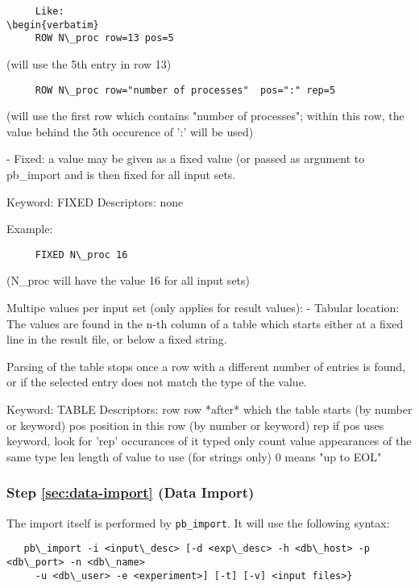 \documentclass[12pt,a4paper]{article}
\begin{document}
\begin{itemize}
\begin{verbatim}
     Like:
\begin{verbatim}
     ROW N\_proc row=13 pos=5
\end{verbatim}
     (will use the 5th entry in row 13)
\begin{verbatim}
     ROW N\_proc row="number of processes"  pos=":" rep=5
\end{verbatim}
     (will use the first row which contains "number of processes"; within this
      row, the value behind the 5th occurence of ':' will be used)

   - Fixed: a value may be given as a fixed value (or passed as argument 
     to pb\_import and is then fixed for all input sets.

     Keyword: FIXED
     Descriptors: none

     Example:
\begin{verbatim}
     FIXED N\_proc 16
\end{verbatim}
     (N\_proc will have the value 16 for all input sets)

   Multipe values per input set (only applies for result values):
   - Tabular location: The values are found in the n-th column of a table 
     which starts either at a fixed line in the result file, or below a 
     fixed string. 

     Parsing of the table stops once a row with a different number of entries
     is found, or if the selected entry does not match the type of the value.

     Keyword: TABLE
     Descriptors: row   row *after* which the table starts (by number or keyword)
                  pos   position in this row (by number or keyword)
                  rep   if pos uses keyword, look for 'rep' occurances of it
                  typed only count value appearances of the same type
                  len   length of value to use (for strings only)
                        0 means "up to EOL"
   
\subsubsection{Step \ref{sec:data-import} (Data Import)}
   The import itself is performed by \texttt{pb\_import}. It will use the following
   syntax:

\begin{verbatim}
   pb\_import -i <input\_desc> [-d <exp\_desc> -h <db\_host> -p <db\_port> -n <db\_name> 
     -u <db\_user> -e <experiment>] [-t] [-v] <input files>}
\end{verbatim}


\end{itemize}
\end{document}
